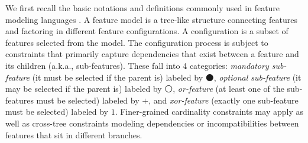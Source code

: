 We first recall the basic
notations 
and definitions commonly used in feature modeling languages \cite{1990_kang_TR,2002_czarnecki_ECOOP,2019_damir_ACM}.
A feature model is a tree-like structure connecting features
and factoring in different feature configurations.
A %
configuration is a subset of features
selected from %
the model.
The configuration process is subject to constraints 
that primarily capture dependencies that 
exist between a feature and its children (a.k.a., sub-features). 
These fall into 4 categories:
\textit{mandatory sub-feature} (it must be selected if the parent is) labeled by $\medbullet$,
\textit{optional sub-feature} (it may be selected if the parent is) labeled by $\medcirc$,
\textit{or-feature} (at least one of the sub-features must be selected) labeled by $+$, 
and \textit{xor-feature} (exactly one sub-feature must be selected) labeled by $1$.
Finer-grained cardinality constraints may apply
as well as cross-tree constraints modeling dependencies or incompatibilities 
between features that sit in different branches.

 

